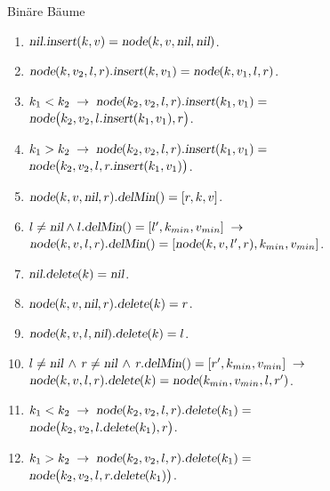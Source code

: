 \documentclass{slides}
\begin{document}
\begin{slide}{}
\normalsize


\begin{center}
Bin\"are B\"aume
\end{center}

\footnotesize
\begin{enumerate}
\item $\textsl{nil}\mathtt{.}\textsl{insert}(k,v) = \textsl{node}(k,v, \textsl{nil}, \textsl{nil})$.
\item $\textsl{node}(k, v_2, l, r)\mathtt{.}\textsl{insert}(k,v_1) = \textsl{node}(k, v_1, l, r)$.
\item $k_1 < k_2 \;\rightarrow \; \textsl{node}(k_2, v_2, l, r)\mathtt{.}\textsl{insert}(k_1, v_1) =$ \\[0.1cm]
      \hspace*{3.1cm} 
      $\textsl{node}\bigl(k_2, v_2, l\mathtt{.}\textsl{insert}(k_1, v_1), r\bigr)$.
\item $k_1 > k_2 \;\rightarrow\; \textsl{node}(k_2, v_2, l, r)\mathtt{.}\textsl{insert}(k_1, v_1) =$ \\[0.1cm]
      \hspace*{3.1cm}  
      $\textsl{node}\bigl(k_2, v_2, l, r\mathtt{.}\textsl{insert}(k_1, v_1)\bigr)$.
\item $\textsl{node}(k, v, \textsl{nil}, r)\mathtt{.}\textsl{delMin}() = [r, k, v]$.
\item $l\not= \textsl{nil} \wedge l\mathtt{.}\textsl{delMin}() = [l',k_{min}, v_{min}] \;\rightarrow$ \\[0.1cm]
       \hspace*{1.cm} 
       $\textsl{node}(k, v, l, r)\mathtt{.}\textsl{delMin}() = [\textsl{node}(k, v, l', r), k_{min}, v_{min}]$.
\item $\textsl{nil}\mathtt{.}\textsl{delete}(k) = \textsl{nil}$.
\item $\textsl{node}(k,v,\textsl{nil},r)\mathtt{.}\textsl{delete}(k) = r$.
\item $\textsl{node}(k,v,l,\textsl{nil})\mathtt{.}\textsl{delete}(k) = l$.
\item $l \not= \textsl{nil} \,\wedge\, r \not= \textsl{nil} \,\wedge\, r\mathtt{.}\textsl{delMin}() = [r',k_{min}, v_{min}]  \;\rightarrow$ \\[0.1cm]
      \hspace*{1.3cm}
      $\textsl{node}(k,v,l,r)\mathtt{.}\textsl{delete}(k) = \textsl{node}(k_{min},v_{min},l,r')$.
\item $k_1 < k_2 \;\rightarrow\; \textsl{node}(k_2,v_2,l,r)\mathtt{.}\textsl{delete}(k_1) =$ \\[0.1cm]
       \hspace*{3.1cm} 
      $\textsl{node}\bigl(k_2,v_2,l\mathtt{.}\textsl{delete}(k_1),r\bigr)$.
\item $k_1 > k_2 \;\rightarrow\; \textsl{node}(k_2,v_2,l,r)\mathtt{.}\textsl{delete}(k_1) =$ \\[0.1cm]
       \hspace*{3.1cm} 
      $\textsl{node}\bigl(k_2,v_2,l,r\mathtt{.}\textsl{delete}(k_1)\bigr)$.
\end{enumerate}



\end{slide}
\end{document}
